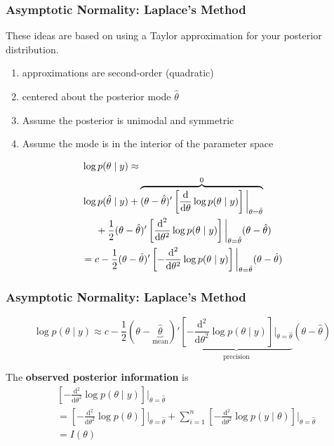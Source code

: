 \documentclass{beamer}
\begin{document}
\begin{frame}
\frametitle{Asymptotic Normality: Laplace's Method}

These ideas are based on using a Taylor approximation for your posterior distribution. 
\begin{enumerate}
\item approximations are second-order (quadratic)
\item centered about the posterior mode $\hat{\theta}$
\item Assume the posterior is unimodal and symmetric
\item Assume the mode is in the interior of the parameter space
\end{enumerate}
\pause

\begin{align*}
&\log p(\theta \mid y ) \approx \\
&\log p(\hat{\theta} \mid y) + \overbrace{(\theta - \hat{\theta})'\left[ \frac{\text{d}}{\text{d}\theta} \log p(\theta \mid y) \right] \bigg|_{\theta = \hat{\theta}}}^{0}  \\
&\hspace{5mm}  + \frac{1}{2}(\theta - \hat{\theta})'\left[\frac{\text{d}^2}{\text{d}\theta^2} \log p(\theta \mid y)\right] \bigg|_{\theta = \hat{\theta}}(\theta - \hat{\theta}) \\
&= c  - \frac{1}{2}(\theta - \hat{\theta})'\left[-\frac{\text{d}^2}{\text{d}\theta^2} \log p(\theta \mid y)\right] \bigg|_{\theta = \hat{\theta}}(\theta - \hat{\theta})
\end{align*}

\end{frame}

\begin{frame}
\frametitle{Asymptotic Normality: Laplace's Method}

\[
\log p(\theta \mid y ) \approx 
c  - \frac{1}{2}(\theta - \underbrace{\hat{\theta} }_{\text{mean}} )' \underbrace{\left[-\frac{\text{d}^2}{\text{d}\theta^2} \log p(\theta \mid y)\right] \bigg|_{\theta = \hat{\theta}}}_{\text{precision} } (\theta - \hat{\theta})
\]

The {\bf observed posterior information} is
\begin{align*}
&\left[-\frac{\text{d}^2}{\text{d}\theta^2} \log p(\theta \mid y)\right] \bigg|_{\theta = \hat{\theta}} \\
&=
\left[-\frac{\text{d}^2}{\text{d}\theta^2} \log p(\theta)\right] \bigg|_{\theta = \hat{\theta}} +
\sum_{i=1}^n \left[-\frac{\text{d}^2}{\text{d}\theta^2} \log p(y \mid \theta)\right] \bigg|_{\theta = \hat{\theta}}\\
&= I(\theta)  
\end{align*}



\end{frame}
\end{document}
